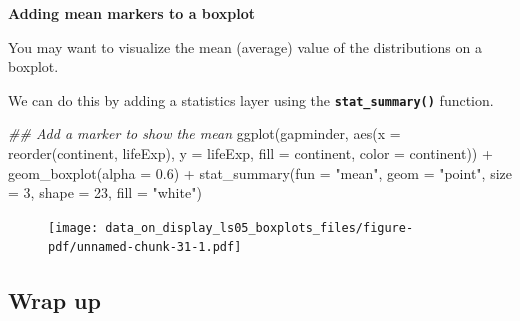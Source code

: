 \documentclass[
  letterpaper,
  DIV=11,
  numbers=noendperiod]{scrreprt}
\newenvironment{Shaded}{\begin{snugshade}}{\end{snugshade}}
\newcommand{\AttributeTok}[1]{\textcolor[rgb]{0.40,0.45,0.13}{#1}}
\newcommand{\DecValTok}[1]{\textcolor[rgb]{0.68,0.00,0.00}{#1}}
\newcommand{\DocumentationTok}[1]{\textcolor[rgb]{0.37,0.37,0.37}{\textit{#1}}}
\newcommand{\FloatTok}[1]{\textcolor[rgb]{0.68,0.00,0.00}{#1}}
\newcommand{\FunctionTok}[1]{\textcolor[rgb]{0.28,0.35,0.67}{#1}}
\newcommand{\NormalTok}[1]{\textcolor[rgb]{0.00,0.23,0.31}{#1}}
\newcommand{\SpecialCharTok}[1]{\textcolor[rgb]{0.37,0.37,0.37}{#1}}
\newcommand{\StringTok}[1]{\textcolor[rgb]{0.13,0.47,0.30}{#1}}
\begin{document}
\begin{tcolorbox}[enhanced jigsaw, colframe=quarto-callout-note-color-frame, rightrule=.15mm, opacityback=0, breakable, coltitle=black, colbacktitle=quarto-callout-note-color!10!white, bottomrule=.15mm, leftrule=.75mm, toprule=.15mm, arc=.35mm, bottomtitle=1mm, colback=white, left=2mm, opacitybacktitle=0.6, titlerule=0mm, title=\textcolor{quarto-callout-note-color}{\faInfo}\hspace{0.5em}{Challenge}, toptitle=1mm]

\textbf{Adding mean markers to a boxplot}

You may want to visualize the mean (average) value of the distributions
on a boxplot.

We can do this by adding a statistics layer using the
\textbf{\texttt{stat\_summary()}} function.

\begin{Shaded}
\begin{Highlighting}[]
\DocumentationTok{\#\# Add a marker to show the mean}
\FunctionTok{ggplot}\NormalTok{(gapminder, }
       \FunctionTok{aes}\NormalTok{(}\AttributeTok{x =} \FunctionTok{reorder}\NormalTok{(continent, lifeExp), }
           \AttributeTok{y =}\NormalTok{ lifeExp, }
           \AttributeTok{fill =}\NormalTok{ continent,}
           \AttributeTok{color =}\NormalTok{ continent)) }\SpecialCharTok{+}
  \FunctionTok{geom\_boxplot}\NormalTok{(}\AttributeTok{alpha =} \FloatTok{0.6}\NormalTok{) }\SpecialCharTok{+}
  \FunctionTok{stat\_summary}\NormalTok{(}\AttributeTok{fun =} \StringTok{"mean"}\NormalTok{,}
               \AttributeTok{geom =} \StringTok{"point"}\NormalTok{,}
               \AttributeTok{size =} \DecValTok{3}\NormalTok{,}
               \AttributeTok{shape =} \DecValTok{23}\NormalTok{,}
               \AttributeTok{fill =} \StringTok{"white"}\NormalTok{)}
\end{Highlighting}
\end{Shaded}

\begin{figure}[H]

{\centering \texttt{[image: data\_on\_display\_ls05\_boxplots\_files/figure-pdf/unnamed-chunk-31-1.pdf]}

}

\end{figure}

\end{tcolorbox}

\hypertarget{wrap-up-12}{%
\subsection{Wrap up}\label{wrap-up-12}}
\end{document}
